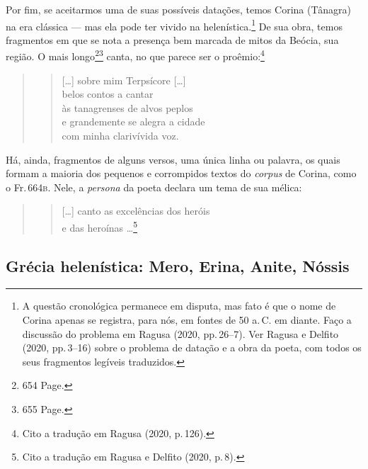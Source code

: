 Por fim, se aceitarmos uma de suas possíveis datações, temos Corina (Tânagra) na
era clássica --- mas ela pode ter vivido na helenística.\footnote{A questão cronológica permanece em disputa, mas fato é que o nome de Corina apenas se registra, para nós, em
fontes de 50 a.\,C. em diante. Faço a discussão do problema em Ragusa (2020, pp.\,26--7). Ver Ragusa e Delfito (2020, pp.\,3--16) sobre o problema de datação e a obra da poeta, com todos os seus fragmentos legíveis traduzidos.} De sua obra, temos
fragmentos em que se nota a presença bem marcada de mitos da Beócia, sua região.
O mais longo\footnote{654 Page.}\footnote{655 Page.}
canta, no que parece ser o proêmio:\footnote{Cito a tradução em Ragusa (2020, p.\,126).}

\begin{quote}
\begin{verse}
{[}\ldots{}{]} sobre mim Terpsícore {[}\ldots{}{]}\\
belos contos a cantar\\
às tanagrenses de alvos peplos\\
e grandemente se alegra a cidade\\
com minha clarivívida voz.
\end{verse}
\end{quote}

Há, ainda, fragmentos de alguns versos, uma única linha ou palavra, os quais
formam a maioria dos pequenos e corrompidos textos do \emph{corpus} de
Corina, como o Fr.\,664\textsc{b}. Nele, a \emph{persona} da poeta declara um
tema de sua mélica:

\begin{quote}
\begin{verse}
{[}\ldots{}{]} canto as excelências dos heróis\\
e das heroínas \ldots{}\footnote{Cito a tradução em Ragusa e Delfito (2020, p.\,8).}
\end{verse}
\end{quote}

\subsection*{Grécia helenística: Mero, Erina, Anite, Nóssis}

